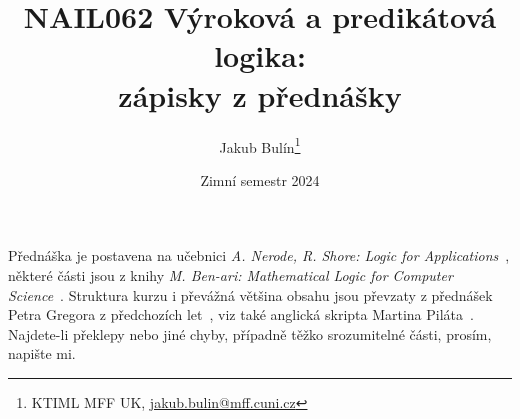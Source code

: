 \title{NAIL062 Výroková a predikátová logika: \\ zápisky z přednášky}
\author{Jakub Bulín\footnote{KTIML MFF UK, \href{mailto://jakub.bulin@mff.cuni.cz}{jakub.bulin@mff.cuni.cz}}}
\date{Zimní semestr 2024}
\maketitle

Přednáška je postavena na učebnici \emph{A. Nerode, R. Shore: Logic for Applications}~\cite{nerode_logic_2012}, některé části jsou z knihy \emph{M. Ben-ari: Mathematical Logic for Computer Science}~\cite{ben-ari_mathematical_2012}. Struktura kurzu i převážná většina obsahu jsou převzaty z přednášek Petra Gregora z předchozích let~\cite{gregor_vyrokova_nodate}, viz také anglická skripta Martina Piláta~\cite{pilat_lecture_nodate}. Najdete-li překlepy nebo jiné chyby, případně těžko srozumitelné části, prosím, napište mi.

\tableofcontents